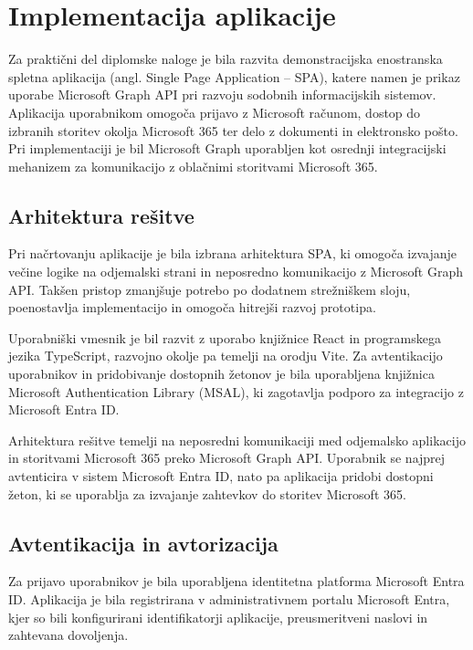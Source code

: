 \documentclass[a4paper, 12pt]{book}
\begin{document}
\chapter{Implementacija aplikacije}

Za praktični del diplomske naloge je bila razvita demonstracijska enostranska spletna aplikacija (angl. Single Page Application – SPA), katere namen je prikaz uporabe Microsoft Graph API pri razvoju sodobnih informacijskih sistemov. Aplikacija uporabnikom omogoča prijavo z Microsoft računom, dostop do izbranih storitev okolja Microsoft 365 ter delo z dokumenti in elektronsko pošto. Pri implementaciji je bil Microsoft Graph uporabljen kot osrednji integracijski mehanizem za komunikacijo z oblačnimi storitvami Microsoft 365.

\section{Arhitektura rešitve}

Pri načrtovanju aplikacije je bila izbrana arhitektura SPA, ki omogoča izvajanje večine logike na odjemalski strani in neposredno komunikacijo z Microsoft Graph API. Takšen pristop zmanjšuje potrebo po dodatnem strežniškem sloju, poenostavlja implementacijo in omogoča hitrejši razvoj prototipa.

Uporabniški vmesnik je bil razvit z uporabo knjižnice React in programskega jezika TypeScript, razvojno okolje pa temelji na orodju Vite. Za avtentikacijo uporabnikov in pridobivanje dostopnih žetonov je bila uporabljena knjižnica Microsoft Authentication Library (MSAL), ki zagotavlja podporo za integracijo z Microsoft Entra ID.

Arhitektura rešitve temelji na neposredni komunikaciji med odjemalsko aplikacijo in storitvami Microsoft 365 preko Microsoft Graph API. Uporabnik se najprej avtenticira v sistem Microsoft Entra ID, nato pa aplikacija pridobi dostopni žeton, ki se uporablja za izvajanje zahtevkov do storitev Microsoft 365.

\section{Avtentikacija in avtorizacija}

Za prijavo uporabnikov je bila uporabljena identitetna platforma Microsoft Entra ID. Aplikacija je bila registrirana v administrativnem portalu Microsoft Entra, kjer so bili konfigurirani identifikatorji aplikacije, preusmeritveni naslovi in zahtevana dovoljenja.
\end{document}
